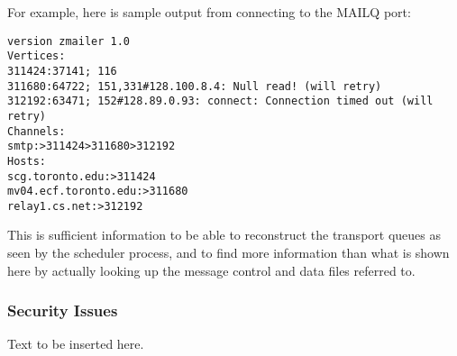 For example, here is sample output from connecting to  the
MAILQ port:
\begin{tscreen}
\begin{verbatim}
version zmailer 1.0
Vertices:
311424:37141; 116
311680:64722; 151,331#128.100.8.4: Null read! (will retry)
312192:63471; 152#128.89.0.93: connect: Connection timed out (will retry)
Channels:
smtp:>311424>311680>312192
Hosts:
scg.toronto.edu:>311424
mv04.ecf.toronto.edu:>311680
relay1.cs.net:>312192
\end{verbatim}
\end{tscreen}


This is sufficient information to be able to reconstruct
the transport queues as seen by the scheduler process, and
to find more information than what is shown here by 
actually  looking  up  the  message     control  and  data  files
referred to.




\subsubsection{Security Issues}

Text to be inserted here.

